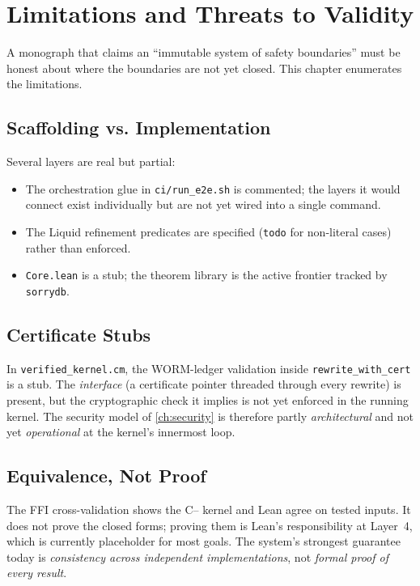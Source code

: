 \chapter{Limitations and Threats to Validity}
\label{ch:limitations}

A monograph that claims an ``immutable system of safety boundaries'' must be
honest about where the boundaries are not yet closed. This chapter enumerates
the limitations.

\section{Scaffolding vs. Implementation}
\label{sec:lim-scaffold}

Several layers are real but partial:
\begin{itemize}
  \item The orchestration glue in \texttt{ci/run\_e2e.sh} is commented;
        the layers it would connect exist individually but are not yet wired
        into a single command.
  \item The Liquid refinement predicates are specified (\texttt{todo} for
        non-literal cases) rather than enforced.
  \item \texttt{Core.lean} is a stub; the theorem library is the active
        frontier tracked by \texttt{sorrydb}.
\end{itemize}

\section{Certificate Stubs}
\label{sec:lim-cert}

In \texttt{verified\_kernel.cm}, the WORM-ledger validation inside
\texttt{rewrite\_with\_cert} is a stub. The \emph{interface} (a certificate
pointer threaded through every rewrite) is present, but the cryptographic
check it implies is not yet enforced in the running kernel. The security model
of \cref{ch:security} is therefore partly \emph{architectural} and not yet
\emph{operational} at the kernel's innermost loop.

\section{Equivalence, Not Proof}
\label{sec:lim-equiv}

The FFI cross-validation shows the C{--} kernel and Lean agree on tested
inputs. It does not prove the closed forms; proving them is Lean's
responsibility at Layer~4, which is currently placeholder for most goals. The
system's strongest guarantee today is \emph{consistency across independent
implementations}, not \emph{formal proof of every result}.


